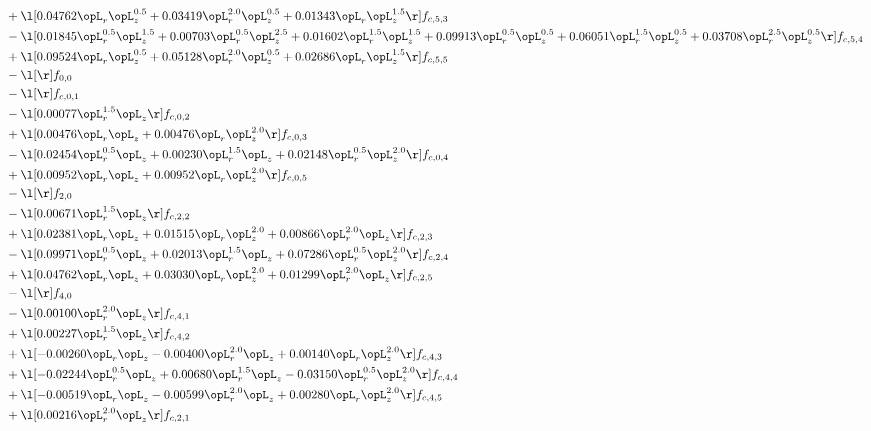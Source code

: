 \begin{alignat}{2}
& + \l[  0.04762 \opL_r \opL_z^{0.5} +  0.03419 \opL_r^{2.0} \opL_z^{0.5} +  0.01343 \opL_r \opL_z^{1.5}  \r] f_{c,5,3} \nonumber \\ 
& - \l[  0.01845 \opL_r^{0.5} \opL_z^{1.5} +  0.00703 \opL_r^{0.5} \opL_z^{2.5} +  0.01602 \opL_r^{1.5} \opL_z^{1.5} +  0.09913 \opL_r^{0.5} \opL_z^{0.5} +  0.06051 \opL_r^{1.5} \opL_z^{0.5} +  0.03708 \opL_r^{2.5} \opL_z^{0.5}  \r] f_{c,5,4} \nonumber \\ 
& + \l[  0.09524 \opL_r \opL_z^{0.5} +  0.05128 \opL_r^{2.0} \opL_z^{0.5} +  0.02686 \opL_r \opL_z^{1.5}  \r] f_{c,5,5} \nonumber \\ 
& - \l[  \r] f_{0,0} \nonumber \\ 
& - \l[  \r] f_{c,0,1} \nonumber \\ 
& - \l[  0.00077 \opL_r^{1.5} \opL_z  \r] f_{c,0,2} \nonumber \\ 
& + \l[  0.00476 \opL_r \opL_z +  0.00476 \opL_r \opL_z^{2.0}  \r] f_{c,0,3} \nonumber \\ 
& - \l[  0.02454 \opL_r^{0.5} \opL_z +  0.00230 \opL_r^{1.5} \opL_z +  0.02148 \opL_r^{0.5} \opL_z^{2.0}  \r] f_{c,0,4} \nonumber \\ 
& + \l[  0.00952 \opL_r \opL_z +  0.00952 \opL_r \opL_z^{2.0}  \r] f_{c,0,5} \nonumber \\ 
& - \l[  \r] f_{2,0} \nonumber \\ 
& - \l[  0.00671 \opL_r^{1.5} \opL_z  \r] f_{c,2,2} \nonumber \\ 
& + \l[  0.02381 \opL_r \opL_z +  0.01515 \opL_r \opL_z^{2.0} +  0.00866 \opL_r^{2.0} \opL_z  \r] f_{c,2,3} \nonumber \\ 
& - \l[  0.09971 \opL_r^{0.5} \opL_z +  0.02013 \opL_r^{1.5} \opL_z +  0.07286 \opL_r^{0.5} \opL_z^{2.0}  \r] f_{c,2,4} \nonumber \\ 
& + \l[  0.04762 \opL_r \opL_z +  0.03030 \opL_r \opL_z^{2.0} +  0.01299 \opL_r^{2.0} \opL_z  \r] f_{c,2,5} \nonumber \\ 
& - \l[  \r] f_{4,0} \nonumber \\ 
& - \l[  0.00100 \opL_r^{2.0} \opL_z  \r] f_{c,4,1} \nonumber \\ 
& + \l[  0.00227 \opL_r^{1.5} \opL_z  \r] f_{c,4,2} \nonumber \\ 
& + \l[  -0.00260 \opL_r \opL_z   -0.00400 \opL_r^{2.0} \opL_z +  0.00140 \opL_r \opL_z^{2.0}  \r] f_{c,4,3} \nonumber \\ 
& + \l[  -0.02244 \opL_r^{0.5} \opL_z +  0.00680 \opL_r^{1.5} \opL_z   -0.03150 \opL_r^{0.5} \opL_z^{2.0}  \r] f_{c,4,4} \nonumber \\ 
& + \l[  -0.00519 \opL_r \opL_z   -0.00599 \opL_r^{2.0} \opL_z +  0.00280 \opL_r \opL_z^{2.0}  \r] f_{c,4,5} \nonumber \\ 
& + \l[  0.00216 \opL_r^{2.0} \opL_z  \r] f_{c,2,1} \nonumber \\ 
\end{alignat} 


